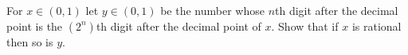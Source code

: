 For $x \in (0, 1)$ let $y \in (0, 1)$ be the number whose $n$th digit after the decimal point is the $(2^n)$th digit after the decimal point of $x$. Show that if $x$ is rational then so is $y$.
